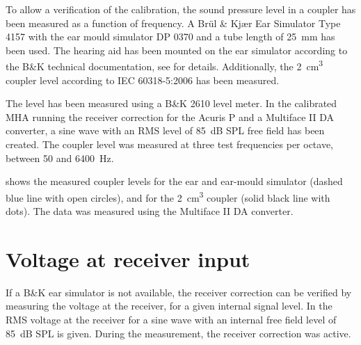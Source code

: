 \documentclass[11pt,a4paper,twoside]{article}
\begin{document}
To allow a verification of the calibration, the sound pressure level
in a coupler has been measured as a function of frequency.
%
A Br\"ul \& Kj\ae{}r Ear Simulator Type 4157 with the ear mould
simulator DP 0370 and a tube length of 25~mm has been used.
%
The hearing aid has been mounted on the ear simulator according to the
B\&K technical documentation, see
 for details.
%
Additionally, the 2~cm\textsuperscript{3} coupler level according to
IEC 60318-5:2006 has been measured.


The level has been measured using a B\&K 2610 level meter.
%
In the calibrated MHA running the receiver correction for the Acuris P
and a Multiface II DA converter, a sine wave with an RMS level of
85~dB SPL free field has been created.
%
The coupler level was measured at three test frequencies per octave,
between 50 and 6400~Hz.

 shows the measured coupler levels for
the ear and ear-mould simulator (dashed blue line with open circles),
and for the 2~cm\textsuperscript{3} coupler (solid black line with
dots). The data was measured using the Multiface II DA converter.
%


\section{Voltage at receiver input}

If a B\&K ear simulator is not available, the receiver correction can
be verified by measuring the voltage at the receiver, for a given
internal signal level.
%
In  the RMS voltage at the
receiver for a sine wave with an internal free field level of 85~dB
SPL is given.
%
During the measurement, the receiver correction was active.

\end{document}
